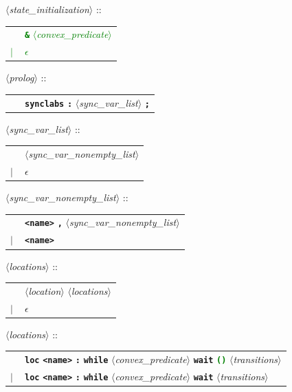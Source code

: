 \documentclass[a4paper,10pt]{article}
\newcommand{\emptystring}{$\epsilon$}
\newcommand{\nt}[1]{$\langle$\emph{#1}$\rangle$}
\newcommand{\regleGrammaire}[1]{\bigskip \noindent \nt{#1} :: \\}
\newcommand{\npec}[1]{\textcolor{green}{#1}}
\newcommand{\code}[1]{\textbf{\texttt{#1}}}
\begin{document}
\regleGrammaire{state\_initialization}
\npec{
\begin{tabular}{l l}
	\  & \code{\&} \nt{convex\_predicate} \\
	$|$ & \emptystring \\
\end{tabular}
}

\regleGrammaire{prolog}
\begin{tabular}{l l}
	\  & \code{synclabs} \code{:} \nt{sync\_var\_list} \code{;} \\
\end{tabular}

\regleGrammaire{sync\_var\_list}
\begin{tabular}{l l}
	\  & \nt{sync\_var\_nonempty\_list} \\
	$|$ & \emptystring \\
\end{tabular}

\regleGrammaire{sync\_var\_nonempty\_list}
\begin{tabular}{l l}
	\  & \code{<name>} \code{,} \nt{sync\_var\_nonempty\_list} \\
	$|$ & \code{<name>} \\
\end{tabular}

\regleGrammaire{locations}
\begin{tabular}{l l}
	\  & \nt{location} \nt{locations} \\
	$|$ & \emptystring \\
\end{tabular}

\regleGrammaire{locations}
\begin{tabular}{l l}
	\  & \code{loc} \code{<name>} \code{:} \code{while} \nt{convex\_predicate} \code{wait} \npec{\code{()}} \nt{transitions} \\
	$|$ & \code{loc} \code{<name>} \code{:} \code{while} \nt{convex\_predicate} \code{wait} \nt{transitions} \\
\end{tabular}
\end{document}
